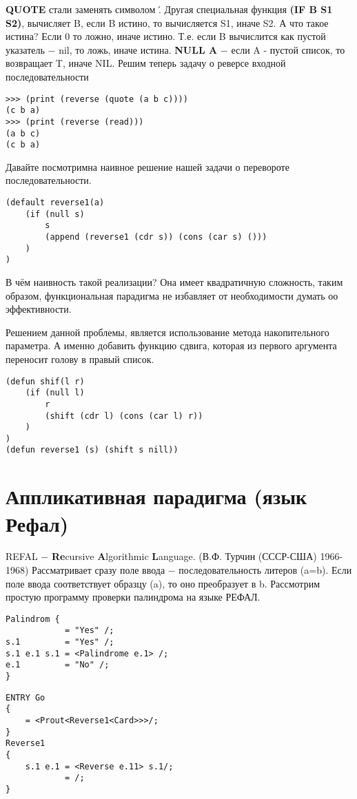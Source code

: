 \documentclass[a4paper, 12pt, titlepage, finall]{extreport}
\begin{document}
            \textbf{QUOTE} стали заменять символом \'.
            Другая специальная функция \textbf{(IF B S1 S2)}, вычисляет B, если B истино, то вычисляется S1, иначе S2.
            А что такое истина? Если 0 то ложно, иначе истино. Т.е. если B вычислится как пустой указатель $-$ nil, то ложь,
            иначе истина. \textbf{NULL A} $-$ если A - пустой список, то возвращает T, иначе NIL.
            Решим теперь задачу о реверсе входной последовательности
\begin{lstlisting}
>>> (print (reverse (quote (a b c))))
(c b a)
>>> (print (reverse (read)))
(a b c)
(c b a)
\end{lstlisting}
            Давайте посмотримна наивное решение нашей задачи о перевороте последовательности.
\begin{lstlisting}
(default reverse1(a)
    (if (null s)
        s
        (append (reverse1 (cdr s)) (cons (car s) ()))
    )
)
\end{lstlisting}
            В чём наивность такой реализации? Она имеет квадратичную сложность, 
            таким образом, функциональная парадигма не избавляет от необходимости думать оо эффективности.

            Решением данной проблемы, является использование метода накопительного параметра. А именно добавить функцию сдвига,
            которая из первого аргумента переносит голову в правый список.
\begin{lstlisting}
(defun shif(l r)
    (if (null l)
        r
        (shift (cdr l) (cons (car l) r))
    )
)
(defun reverse1 (s) (shift s nill))
\end{lstlisting}
    \chapter{Аппликативная парадигма (язык Рефал)}
        REFAL $-$ \textbf{Re}cursive \textbf{A}lgorithmic \textbf{L}anguage. (В.Ф. Турчин (СССР-США) 1966-1968)
        Рассматривает сразу поле ввода $-$ последовательность литеров (a=b).
        Если поле ввода соответствует образцу (a), то оно преобразует в b.
        Рассмотрим простую программу проверки палиндрома на языке РЕФАЛ.
\begin{lstlisting}
Palindrom {
            = "Yes" /;
s.1         = "Yes" /;
s.1 e.1 s.1 = <Palindrome e.1> /;
e.1         = "No" /;
}
\end{lstlisting}
\begin{lstlisting}
ENTRY Go
{
    = <Prout<Reverse1<Card>>>/;
}
Reverse1
{
    s.1 e.1 = <Reverse e.11> s.1/;
            = /;
}
\end{lstlisting}
\end{document}
